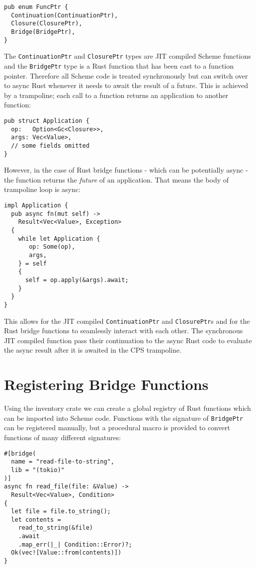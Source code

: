 \documentclass[sigplan,authordraft]{acmart}
\begin{document}
\begin{verbatim}
pub enum FuncPtr {
  Continuation(ContinuationPtr),
  Closure(ClosurePtr),
  Bridge(BridgePtr),
}
\end{verbatim}

The \texttt{ContinuationPtr} and \texttt{ClosurePtr} types are JIT compiled
Scheme functions and the \texttt{BridgePtr} type is a Rust function that has
been cast to a function pointer. Therefore all Scheme code is treated
synchronously but can switch over to async Rust whenever it needs to await the
result of a future. This is achieved by a trampoline; each call to a function
returns an application to another function:

\begin{verbatim}
pub struct Application {
  op:   Option<Gc<Closure>>,
  args: Vec<Value>,
  // some fields omitted 
}
\end{verbatim}

However, in the case of Rust bridge functions - which can be potentially async -
the function returns the \textit{future} of an application. That means the body of
trampoline loop is async:

\begin{verbatim}
impl Application {
  pub async fn(mut self) ->
    Result<Vec<Value>, Exception>
  {
    while let Application {
       op: Some(op),
       args,
    } = self
    {
      self = op.apply(&args).await;
    }
  }
}
\end{verbatim}

This allows for the JIT compiled \texttt{ContinuationPtr} and
\texttt{ClosurePtr}s and for the Rust bridge functions to seamlessly interact
with each other. The synchronous JIT compiled function pass their continuation
to the async Rust code to evaluate the async result after it is awaited in the
CPS trampoline.

\section{Registering Bridge Functions}

Using the inventory\cite{inventory} crate we can create a global registry of Rust
functions which can be imported into Scheme code. Functions with the signature of
\texttt{BridgePtr} can be registered manually, but a procedural macro is provided
to convert functions of many different signatures:

\begin{verbatim}
#[bridge(
  name = "read-file-to-string",
  lib = "(tokio)"
)]
async fn read_file(file: &Value) ->
  Result<Vec<Value>, Condition>
{
  let file = file.to_string();
  let contents =
    read_to_string(&file)
    .await
    .map_err(|_| Condition::Error)?;
  Ok(vec![Value::from(contents)])
}
\end{verbatim}
\end{document}
